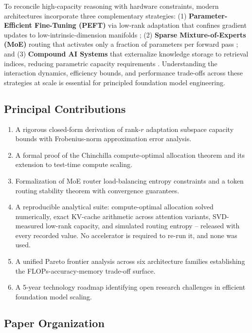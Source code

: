 \documentclass[10pt,twocolumn,letterpaper]{article}
\begin{document}
To reconcile high-capacity reasoning with hardware constraints, modern architectures incorporate three complementary strategies: (1) \textbf{Parameter-Efficient Fine-Tuning (PEFT)} via low-rank adaptation that confines gradient updates to low-intrinsic-dimension manifolds \cite{arxiv_2305_18290,arxiv_2208_14227}; (2) \textbf{Sparse Mixture-of-Experts (MoE)} routing that activates only a fraction of parameters per forward pass \cite{arxiv_2412_06333}; and (3) \textbf{Compound AI Systems} that externalize knowledge storage to retrieval indices, reducing parametric capacity requirements \cite{arxiv_2406_00584}. Understanding the interaction dynamics, efficiency bounds, and performance trade-offs across these strategies at scale is essential for principled foundation model engineering.


\subsection{Principal Contributions}


\begin{enumerate}
  \item A rigorous closed-form derivation of rank-$r$ adaptation subspace capacity bounds with Frobenius-norm approximation error analysis.
  \item A formal proof of the Chinchilla compute-optimal allocation theorem and its extension to test-time compute scaling.
  \item Formalization of MoE router load-balancing entropy constraints and a token routing stability theorem with convergence guarantees.
  \item A reproducible analytical suite: compute-optimal allocation solved numerically, exact KV-cache arithmetic across attention variants, SVD-measured low-rank capacity, and simulated routing entropy -- released with every recorded value. No accelerator is required to re-run it, and none was used.
  \item A unified Pareto frontier analysis across six architecture families establishing the FLOPs-accuracy-memory trade-off surface.
  \item A 5-year technology roadmap identifying open research challenges in efficient foundation model scaling.
\end{enumerate}


\subsection{Paper Organization}
\end{document}
